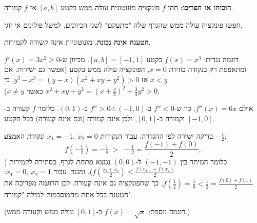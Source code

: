 
\begin{question}
\textbf{הוכיחו או הפריכו:} תהי $f$ פונקציה מונוטונית עולה ממש בקטע $[a,b]$ אז $f$ קמורה.
\end{question}

\begin{hint}
חפשו פונקציה עולה ממש שהגרף שלה "מתעקם" לשני הכיוונים, למשל פולינום אי-זוגי.
\end{hint}

\begin{solution}
\textbf{הטענה אינה נכונה.} מונוטוניות אינה קשורה לקמירות.

דוגמה נגדית: $f(x)=x^3$ בקטע $[a,b]=[-1,1]$. מכיוון ש-$f'(x)=3x^2\ge 0$ ומתאפסת רק בנקודה בודדת $x=0$, הפונקציה עולה ממש בקטע (אפשר גם ישירות: אם $x<y$ אז $y^3-x^3=(y-x)(x^2+xy+y^2)>0$, כי $x^2+xy+y^2=(x+\tfrac y2)^2+\tfrac34y^2>0$ כאשר $x\ne y$).

אולם $f''(x)=6x$, כך ש-$f''<0$ ב-$(-1,0)$ ו-$f''>0$ ב-$(0,1)$. כלומר $f$ קעורה ב-$[-1,0]$ וקמורה ב-$[0,1]$, ולכן אינה קמורה (וגם אינה קעורה) בכל הקטע.

בדיקה ישירה לפי ההגדרה: עבור הנקודות $x_1=-1,\ x_2=0$ ונקודת האמצע $-\tfrac12$:
\[ f\!\left(-\tfrac12\right)=-\tfrac18 \;>\; -\tfrac12=\frac{f(-1)+f(0)}{2}, \]
כלומר המיתר בין $(-1,-1)$ ל-$(0,0)$ נמצא \emph{מתחת} לגרף, בסתירה לקמירות ($f(\tfrac{x_1+x_2}{2})\le \tfrac{f(x_1)+f(x_2)}{2}$). ומנגד, עבור $x_1=0,\ x_2=1$: $f(\tfrac12)=\tfrac18<\tfrac12=\tfrac{f(0)+f(1)}2$, כך שהפונקציה גם אינה קעורה. לכן הדוגמה מפריכה את הטענה בכל אחת מהמוסכמות למילה "קמורה".

(דוגמה נוספת: $f(x)=\sqrt{x}$ ב-$[0,1]$ עולה ממש וקעורה ממש.)
\end{solution}
